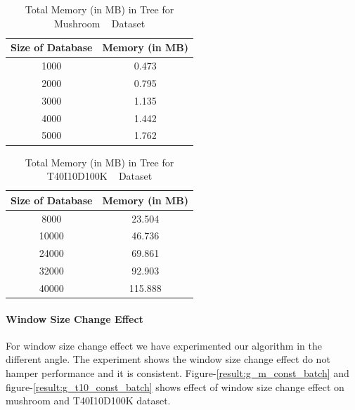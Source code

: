 \documentclass[conference]{IEEEtran}
\begin{document}
    \begin{table}[h]
        \centering
        \begin{tabular}{|c|c|}
        \hline 
       Size of Database        &    Memory (in MB)\\    \hline\hline
        
        1000&0.473\\\hline
        2000&0.795\\\hline
        3000&1.135\\\hline
        4000&1.442\\\hline
        5000&1.762\\\hline
    
            \end{tabular}
        \caption{ Total Memory (in MB) in Tree for Mushroom ~\cite{dataset} Dataset}
        \label{result:g_m_const_tran_mem}
        \end{table}
    
    \begin{table}[h]
        \centering
        \begin{tabular}{|c|c|}
        \hline 
       Size of Database       &    Memory (in MB)\\    \hline\hline
        
        8000 &23.504\\\hline
        10000&46.736\\\hline
        24000&69.861\\\hline
        32000&92.903\\\hline
        40000&115.888\\\hline
    
            \end{tabular}
        \caption{ Total Memory (in MB) in Tree for T40I10D100K ~\cite{dataset} Dataset}
        \label{result:g_t10_const_tran_mem}
        \end{table}

\paragraph{Window Size Change Effect}For window size change effect we have experimented our algorithm in the different angle. The experiment shows the window size change effect do not hamper performance and it is consistent. Figure-\ref{result:g_m_const_batch} and figure-\ref{result:g_t10_const_batch} shows effect of window size change effect on mushroom and T40I10D100K dataset.
\end{document}
